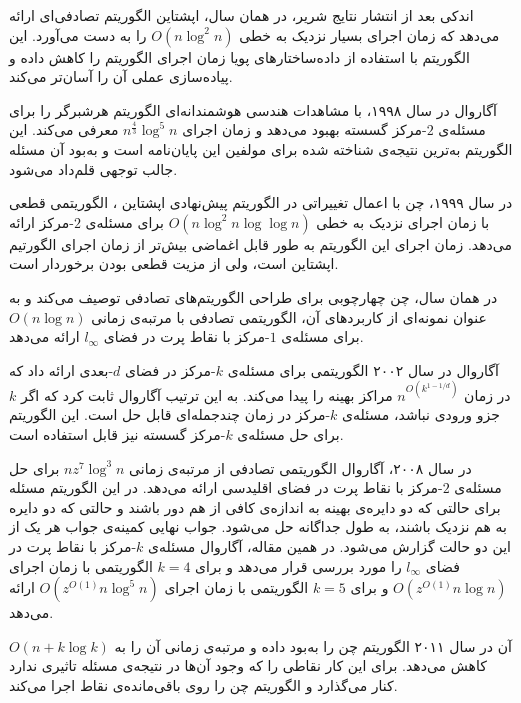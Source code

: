 اندکی بعد از انتشار نتایج شریر، در همان سال، اپشتاین  الگوریتم تصادفی‌ای ارائه می‌دهد که زمان اجرای بسیار نزدیک به خطی $O(n \log^2 n)$ را به دست می‌آورد. این الگوریتم با استفاده از داده‌ساختارهای پویا زمان اجرای الگوریتم را کاهش داده و پیاده‌سازی عملی آن را آسان‌تر می‌کند.

آگاروال  در سال ۱۹۹۸، با مشاهدات هندسی هوشمندانه‌ای الگوریتم هرشبرگر  را برای مسئله‌ی $2$-مرکز گسسته بهبود می‌دهد و زمان اجرای
$n^{\frac{4}{3}} \log^5 n$
معرفی می‌کند. این الگوریتم به‌ترین نتیجه‌ی شناخته شده برای مولفین این پایان‌نامه است و به‌بود آن مسئله جالب توجهی قلم‌داد می‌شود.

در سال ۱۹۹۹، چن  با اعمال تغییراتی در الگوریتم پیش‌نهادی اپشتاین ، الگوریتمی قطعی با زمان اجرای نزدیک به خطی $O(n \log^2 n \log\log n)$ برای مسئله‌ی $2$-مرکز ارائه می‌دهد. زمان اجرای این الگوریتم به طور قابل اغماضی بیش‌تر از زمان اجرای الگورتیم اپشتاین است، ولی از مزیت قطعی بودن برخوردار است.

در همان سال، چن  چهارچوبی برای طراحی الگوریتم‌های تصادفی توصیف می‌کند و به عنوان نمونه‌ای از کاربردهای آن، الگوریتمی تصادفی با مرتبه‌ی زمانی $O(n \log n)$ برای مسئله‌ی $1$-مرکز با نقاط پرت در فضای $l_\infty$ ارائه می‌دهد.

آگاروال  در سال ۲۰۰۲ الگوریتمی برای مسئله‌ی $k$-مرکز در فضای $d$-بعدی ارائه داد که در زمان
$n^{O(k^{1-1/d})}$
مراکز بهینه را پیدا می‌کند. به این ترتیب آگاروال ثابت کرد که اگر $k$ جزو ورودی نباشد، مسئله‌ی $k$-مرکز در زمان چندجمله‌ای قابل حل است. این الگوریتم برای حل مسئله‌ی $k$-مرکز گسسته نیز قابل استفاده است.

در سال ۲۰۰۸، آگاروال  الگوریتمی تصادفی از مرتبه‌ی زمانی $n z^7 \log^3 n$ برای حل مسئله‌ی $2$-مرکز با نقاط پرت در فضای اقلیدسی ارائه می‌دهد. در این الگوریتم مسئله برای حالتی که دو دایره‌ی بهینه به اندازه‌ی کافی از هم دور باشند و حالتی که دو دایره به هم نزدیک باشند، به طول جداگانه حل می‌شود. جواب نهایی کمینه‌ی جواب هر یک از این دو حالت گزارش می‌شود. در همین مقاله، آگاروال مسئله‌ی $k$-مرکز با نقاط پرت در فضای $l_\infty$ را مورد بررسی قرار می‌دهد و برای $k=4$ الگوریتمی با زمان اجرای
$O(z^{O(1)} n \log n)$
و برای $k=5$ الگوریتمی با زمان اجرای
$O(z^{O(1)} n \log^5 n)$
ارائه می‌دهد.

آن  در سال ۲۰۱۱ الگوریتم چن  را به‌بود داده و مرتبه‌ی زمانی آن را به $O(n + k \log k)$ کاهش می‌دهد. برای این کار نقاطی را که وجود آن‌ها در نتیجه‌ی مسئله تاثیری ندارد کنار می‌گذارد و الگوریتم چن را روی باقی‌مانده‌ی نقاط اجرا می‌کند.
